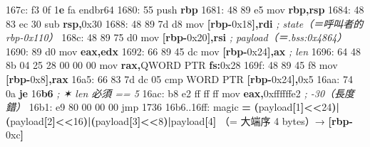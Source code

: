 \documentclass[10pt,a4paper]{article}
\newenvironment{Shaded}{\begin{snugshade}}{\end{snugshade}}
\newcommand{\BaseNTok}[1]{\textcolor[rgb]{0.00,0.00,0.81}{#1}}
\newcommand{\BuiltInTok}[1]{#1}
\newcommand{\CommentTok}[1]{\textcolor[rgb]{0.56,0.35,0.01}{\textit{#1}}}
\newcommand{\ControlFlowTok}[1]{\textcolor[rgb]{0.13,0.29,0.53}{\textbf{#1}}}
\newcommand{\DataTypeTok}[1]{\textcolor[rgb]{0.13,0.29,0.53}{#1}}
\newcommand{\DecValTok}[1]{\textcolor[rgb]{0.00,0.00,0.81}{#1}}
\newcommand{\ErrorTok}[1]{\textcolor[rgb]{0.64,0.00,0.00}{\textbf{#1}}}
\newcommand{\FloatTok}[1]{\textcolor[rgb]{0.00,0.00,0.81}{#1}}
\newcommand{\KeywordTok}[1]{\textcolor[rgb]{0.13,0.29,0.53}{\textbf{#1}}}
\newcommand{\NormalTok}[1]{#1}
\newcommand{\OperatorTok}[1]{\textcolor[rgb]{0.81,0.36,0.00}{\textbf{#1}}}
\renewenvironment{Shaded}{%
  \def\FrameCommand{\fboxsep=3.2pt\colorbox{shadecolor}}%
  \MakeFramed{\advance\hsize-\width\FrameRestore\small}%
}{%
  \endMakeFramed
}
\begin{document}
\begin{Shaded}
\begin{Highlighting}[]
\NormalTok{167c: f3 }\FloatTok{0}\BaseNTok{f} \DecValTok{1}\ErrorTok{e}\NormalTok{ fa            endbr64}
\NormalTok{1680: 55                     }\BuiltInTok{push}   \KeywordTok{rbp}
\NormalTok{1681: 48 89 e5               mov    }\KeywordTok{rbp}\OperatorTok{,}\KeywordTok{rsp}
\NormalTok{1684: 48 83 ec }\DecValTok{30}\NormalTok{            sub    }\KeywordTok{rsp}\OperatorTok{,}\BaseNTok{0x30}
\NormalTok{1688: 48 89 7d d8            mov    }\OperatorTok{[}\KeywordTok{rbp}\OperatorTok{{-}}\BaseNTok{0x18}\OperatorTok{],}\KeywordTok{rdi}        \CommentTok{; state（＝呼叫者的 rbp{-}0x110）}
\NormalTok{168c: 48 89 75 d0            mov    }\OperatorTok{[}\KeywordTok{rbp}\OperatorTok{{-}}\BaseNTok{0x20}\OperatorTok{],}\KeywordTok{rsi}        \CommentTok{; payload（＝.bss:0x4864）}
\NormalTok{1690: 89 d0                  mov    }\KeywordTok{eax}\OperatorTok{,}\KeywordTok{edx}
\NormalTok{1692: 66 89 45 dc            mov    }\OperatorTok{[}\KeywordTok{rbp}\OperatorTok{{-}}\BaseNTok{0x24}\OperatorTok{],}\KeywordTok{ax}         \CommentTok{; len}
\NormalTok{1696: 64 48 8b 04 25 28 00 00 00  }\BuiltInTok{mov} \KeywordTok{rax}\OperatorTok{,}\DataTypeTok{QWORD} \DataTypeTok{PTR} \KeywordTok{fs}\OperatorTok{:}\BaseNTok{0x28}
\NormalTok{169f: 48 89 45 f8            mov    }\OperatorTok{[}\KeywordTok{rbp}\OperatorTok{{-}}\BaseNTok{0x8}\OperatorTok{],}\KeywordTok{rax}
\NormalTok{16a5: 66 83 7d dc }\DecValTok{05}\NormalTok{         cmp    }\DataTypeTok{WORD} \DataTypeTok{PTR} \OperatorTok{[}\KeywordTok{rbp}\OperatorTok{{-}}\BaseNTok{0x24}\OperatorTok{],}\BaseNTok{0x5}
\NormalTok{16aa: 74 0a                  }\ControlFlowTok{je}     \DecValTok{16}\ErrorTok{b6}                  \CommentTok{; ✶ len 必須 == 5}
\NormalTok{16ac: b8 e2 ff ff ff         mov    }\KeywordTok{eax}\OperatorTok{,}\BaseNTok{0xffffffe2}        \CommentTok{; {-}30（長度錯）}
\NormalTok{16b1: e9 }\DecValTok{80} \DecValTok{00} \DecValTok{00} \DecValTok{00}\NormalTok{         jmp    }\DecValTok{1736}
\NormalTok{16b6..16ff: magic }\OperatorTok{=} \OperatorTok{(}\NormalTok{payload}\OperatorTok{[}\DecValTok{1}\OperatorTok{]\textless{}\textless{}}\DecValTok{24}\OperatorTok{)|(}\NormalTok{payload}\OperatorTok{[}\DecValTok{2}\OperatorTok{]\textless{}\textless{}}\DecValTok{16}\OperatorTok{)|(}\NormalTok{payload}\OperatorTok{[}\DecValTok{3}\OperatorTok{]\textless{}\textless{}}\DecValTok{8}\OperatorTok{)|}\NormalTok{payload}\OperatorTok{[}\DecValTok{4}\OperatorTok{]}
\NormalTok{             （= 大端序 4 bytes）→ }\OperatorTok{[}\KeywordTok{rbp}\OperatorTok{{-}}\BaseNTok{0xc}\OperatorTok{]}

\end{Highlighting}
\end{Shaded}
\end{document}
